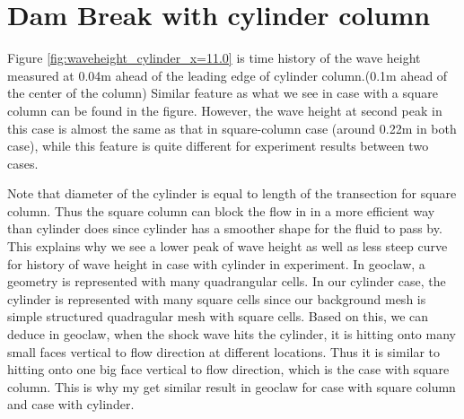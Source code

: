 \documentclass[11pt]{article}
\begin{document}
\section{Dam Break with cylinder column}\label{Sec:Cylinder}
Figure \ref{fig:waveheight_cylinder_x=11.0} is time history of the wave height measured at 0.04m ahead of the leading edge of cylinder column.(0.1m ahead of the center of the column)
Similar feature as what we see in case with a square column can be found in the figure.
However, the wave height at second peak in this case is almost the same as that in square-column case (around 0.22m in both case), while this feature is quite different for experiment results between two cases.
\par
Note that diameter of the cylinder is equal to length of the transection for square column. Thus the square column can block the flow in in a more efficient way than cylinder does since cylinder has a smoother shape for the fluid to pass by. 
This explains why we see a lower peak of wave height as well as less steep curve for history of wave height in case with cylinder in experiment. 
In geoclaw, a geometry is represented with many quadrangular cells. In our cylinder case, the cylinder is represented with many square cells since our background mesh is simple structured quadragular mesh with square cells. 
Based on this, we can deduce in geoclaw, when the shock wave hits the cylinder, it is hitting onto many small faces vertical to flow direction at different locations. 
Thus it is similar to hitting onto one big face vertical to flow direction, which is the case with square column.  
This is why my get similar result in geoclaw for case with square column and case with cylinder.
\end{document}
